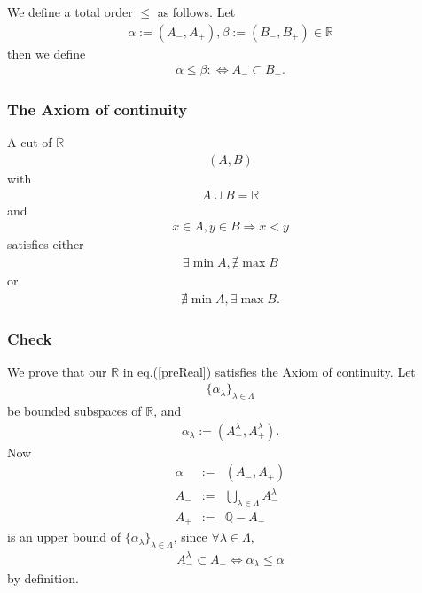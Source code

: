 \documentclass[11pt]{book}
\begin{document}
We define a total order $\leq$ as follows.
Let 
\begin{eqnarray}
\alpha := (A_-, A_+), \beta := (B_-, B_+) \in \mathbb{R}
\end{eqnarray}
then we define
\begin{eqnarray}
\alpha \leq \beta :\Leftrightarrow A_- \subset B_-.
\end{eqnarray}

\subsubsection{The Axiom of continuity}
A cut of $\mathbb{R}$
\begin{eqnarray}
(A,B)
\end{eqnarray}
with
\begin{eqnarray}
A \cup B = \mathbb{R}
\end{eqnarray}
and
\begin{eqnarray}
x \in A, y \in B \Rightarrow x < y
\end{eqnarray}
satisfies either
\begin{eqnarray}
\label{minA}
\exists \min A, \nexists \max B
\end{eqnarray}
or
\begin{eqnarray}
\label{maxB}
\nexists \min A, \exists \max B.
\end{eqnarray}

\subsubsection{Check}
We prove that our $\mathbb{R}$ in eq.(\ref{preReal}) satisfies the Axiom of continuity.
Let 
\begin{eqnarray}
\{\alpha_\lambda\}_{\lambda \in \Lambda}
\end{eqnarray}
be bounded subspaces of $\mathbb{R}$, and
\begin{eqnarray}
\alpha_\lambda := (A^\lambda_-, A^\lambda_+).
\end{eqnarray}
Now
\begin{eqnarray}
\alpha &:=& (A_-, A_+) \\
A_- &:=& \bigcup_{\lambda \in \Lambda} A^\lambda_- \\
A_+ &:=& \mathbb{Q} - A_-
\end{eqnarray}
is an upper bound of $\{\alpha_\lambda\}_{\lambda \in \Lambda}$, since $\forall \lambda \in \Lambda$,
\begin{eqnarray}
A^\lambda_- \subset A_- \Leftrightarrow \alpha_\lambda \leq \alpha
\end{eqnarray}
by definition.
\end{document}
